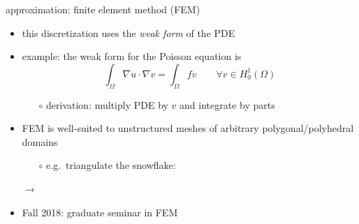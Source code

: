 \documentclass[hide notes,intlimits,usenames,dvipsnames]{beamer}
\newcommand{\grad}{\nabla}
\begin{document}
\begin{frame}{approximation: finite element method (FEM)}
\begin{itemize}
\item this discretization uses the \emph{weak form} of the PDE
\item example: the weak form for the Poisson equation is
    $$\int_\Omega \grad u \cdot \grad v = \int_\Omega f v \qquad \forall v \in H_0^1(\Omega)$$
    \vspace{-4mm}
	\begin{itemize}
	\item[$\circ$] derivation: multiply PDE by $v$ and integrate by parts
	\end{itemize}
\item FEM is well-suited to unstructured meshes of arbitrary polygonal/polyhedral domains
	\begin{itemize}
	\item[$\circ$] e.g.~triangulate the snowflake:
	\end{itemize}

\begin{center}
\begin{tikzpicture}[scale=1.3,baseline]  \end{tikzpicture}
\qquad $\to$ \qquad
\begin{tikzpicture}[scale=1.3,baseline]  \end{tikzpicture}
\end{center}

\footnotesize
\item \alert{Fall 2018: graduate seminar in FEM}
\end{itemize}
\end{frame}
\end{document}
